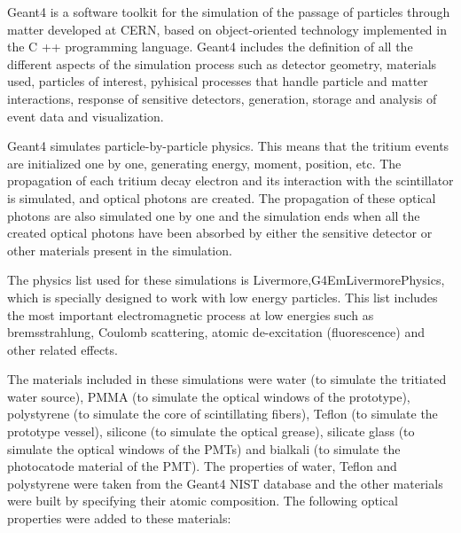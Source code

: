 Geant4 is a software toolkit for the simulation of the passage of particles through matter developed at CERN, based on object-oriented technology implemented in the C ++ programming language. Geant4 includes the definition of all the different aspects of the simulation process such as detector geometry, materials used, particles of interest, pyhisical processes that handle particle and matter interactions, response of sensitive detectors, generation, storage and analysis of event data and visualization.

Geant4 simulates particle-by-particle physics. This means that the tritium events are initialized one by one, generating energy, moment, position, etc. The propagation of each tritium decay electron and its interaction  with the scintillator is simulated, and optical photons are created. The propagation of these optical photons are also simulated one by one and the simulation ends when all the created optical photons have been absorbed by either the sensitive detector or other materials present in the simulation. 

The physics list used for these simulations is Livermore,\newline G4EmLivermorePhysics, which is specially designed to work with low energy particles. This list includes the most important electromagnetic process at low energies such as bremsstrahlung, Coulomb scattering, atomic de-excitation (fluorescence) and other related effects. 

The materials included in these simulations were water (to simulate the tritiated water source), PMMA (to simulate the optical windows of the prototype), polystyrene (to simulate the core of scintillating fibers), Teflon (to simulate the prototype vessel), silicone (to simulate the optical grease), silicate glass (to simulate the optical windows of the PMTs) and bialkali (to simulate the photocatode material of the PMT). The properties of water, Teflon and polystyrene were taken from the Geant4 NIST database and the other materials were built by specifying their atomic composition. The following optical properties were added to these materials:

